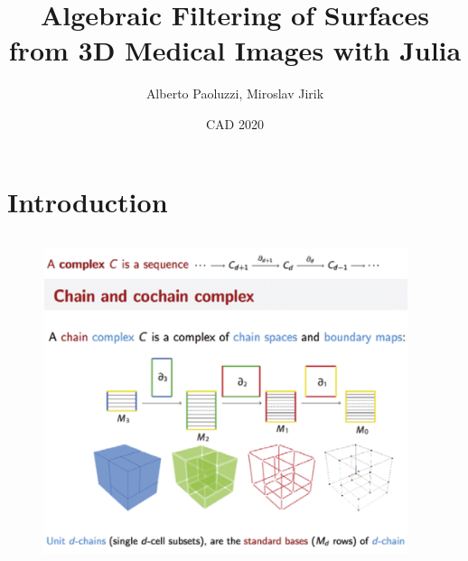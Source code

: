 \documentclass{beamer}
\title[Your Short Title]{Algebraic Filtering of Surfaces from 3D Medical Images with Julia}
\author{Alberto Paoluzzi, Miroslav Jirik}
\institute{Roma Tre University, Charles University}
\date{CAD 2020}
\begin{document}
\begin{frame}
  \titlepage
\end{frame}




\section{Introduction}

\begin{frame}
\begin{columns}
\end{columns}
\begin{figure}
    \centering
    \includegraphics[width=0.95\textwidth]{figs/L02-chain-complex.png}
\end{figure}
    
\end{frame}
\end{document}
